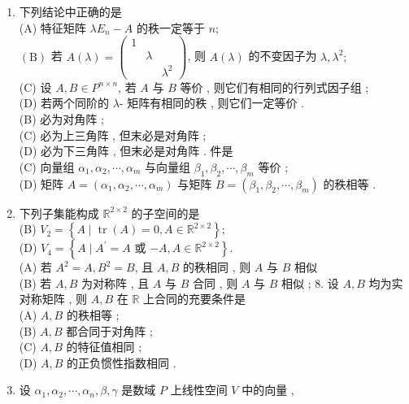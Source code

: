 \documentclass[10pt]{article}
\begin{document}
{\begin{enumerate}
  \item  下列结论中正确的是 \\
(A)  特征矩阵  $\lambda E_{n}-A$  的秩一定等于  $n$;\\
$(\mathrm{B})$  若  $A(\lambda)=\left(\begin{array}{ccc}1 & & \\ & \lambda & \\ & & \lambda^{2}\end{array}\right)$,  则  $A(\lambda)$  的不变因子为  $\lambda, \lambda^{2} ;$\\
(C)  设  $A, B \in P^{n \times n}$,  若  $A$  与  $B$  等价 ,  则它们有相同的行列式因子组 ;\\
(D)  若两个同阶的  $\lambda$- 矩阵有相同的秩 ,  则它们一定等价 .\\
(B)  必为对角阵 ;\\
(C)  必为上三角阵 ,  但末必是对角阵 ;\\
(D)  必为下三角阵 ,  但末必是对角阵 .  件是 \\
(C)  向量组  $\alpha_{1}, \alpha_{2}, \cdots, \alpha_{m}$  与向量组  $\beta_{1}, \beta_{2}, \cdots, \beta_{m}$  等价 ;\\
(D)  矩阵  $A=\left(\alpha_{1}, \alpha_{2}, \cdots, \alpha_{m}\right)$  与矩阵  $B=\left(\beta_{1}, \beta_{2}, \cdots, \beta_{m}\right)$  的秩相等 .

  \item  下列子集能构成  $\mathbb{R}^{2 \times 2}$  的子空间的是 \\
(B) $V_{2}=\left\{A \mid \operatorname{tr}(A)=0, A \in \mathbb{R}^{2 \times 2}\right\}$;\\
(D) $V_{4}=\left\{A \mid A^{\prime}=A\right.$  或  $\left.-A, A \in \mathbb{R}^{2 \times 2}\right\}$.\\
(A)  若  $A^{2}=A, B^{2}=B$,  且  $A, B$  的秩相同 ,  则  $A$  与  $B$  相似 \\
(B)  若  $A, B$  为对称阵 ,  且  $A$  与  $B$  合同 ,  则  $A$  与  $B$  相似 ; 8.  设  $A, B$  均为实对称矩阵 ,  则  $A, B$  在  $\mathbb{R}$  上合同的充要条件是 \\
(A) $A, B$  的秩相等 ;\\
(B) $A, B$  都合同于对角阵 ;\\
(C) $A, B$  的特征值相同 ;\\
(D) $A, B$  的正负惯性指数相同 .

  \item  设  $\alpha_{1}, \alpha_{2}, \cdots, \alpha_{n}, \beta, \gamma$  是数域  $P$  上线性空间  $V$  中的向量 ,


\end{enumerate}}
\end{document}

